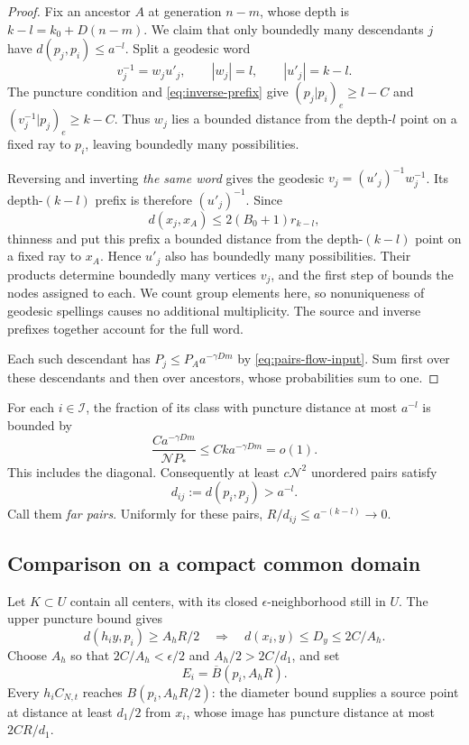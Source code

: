\begin{proof}
Fix an ancestor $A$ at generation $n-m$, whose depth is
$k-l=k_0+D(n-m)$. We claim that only boundedly
many descendants $j$ have $d(p_j,p_i)\le a^{-l}$. Split a geodesic word
\[
 v_j^{-1}=w_ju'_j,\qquad |w_j|=l,\qquad |u'_j|=k-l.
\]
The puncture condition and \eqref{eq:inverse-prefix} give
$(p_j|p_i)_e\ge l-C$ and $(v_j^{-1}|p_j)_e\ge k-C$.
Thus $w_j$ lies a bounded distance from the depth-$l$ point on a fixed
ray to $p_i$, leaving boundedly many possibilities.

Reversing and inverting \emph{the same word} gives the geodesic
$v_j=(u'_j)^{-1}w_j^{-1}$. Its depth-$(k-l)$ prefix is therefore
$(u'_j)^{-1}$. Since
\[
 d(x_j,x_A)\le2(B_0+1)r_{k-l},
\]
thinness and  put this prefix a bounded distance from
the depth-$(k-l)$ point on a fixed ray to $x_A$. Hence $u'_j$ also has
boundedly many possibilities. Their products determine boundedly
many vertices $v_j$, and the first step of
 bounds the nodes assigned to each.
We count group elements here, so nonuniqueness of geodesic spellings
causes no additional multiplicity. The source and inverse prefixes
together account for the full word.

Each such descendant has $P_j\le P_Aa^{-\gamma Dm}$ by
\eqref{eq:pairs-flow-input}. Sum first over these descendants and
then over ancestors, whose probabilities sum to one.
\end{proof}

For each $i\in\mathcal I$, the fraction of its class with puncture
distance at most $a^{-l}$ is bounded by
\[
 \frac{Ca^{-\gamma Dm}}{\mathcal NP_*}
 \le Ck a^{-\gamma Dm}=o(1).
\]
This includes the diagonal. Consequently at least $c\mathcal N^2$
unordered pairs satisfy
\begin{equation}
 d_{ij}:=d(p_i,p_j)>a^{-l}.
 \label{eq:far-pair}
\end{equation}
Call them \emph{far pairs}. Uniformly for these pairs,
$R/d_{ij}\le a^{-(k-l)}\to0$.

\subsection{Comparison on a compact common domain}

Let $K\subset U$ contain all centers, with its closed
$\epsilon$-neighborhood still in $U$. The upper puncture bound gives
\begin{equation}
 d(h_i y,p_i)\ge A_hR/2
 \quad\Longrightarrow\quad
 d(x_i,y)\le D_y\le2C/A_h.
 \label{eq:exterior-preimage}
\end{equation}
Choose $A_h$ so that $2C/A_h<\epsilon/2$ and $A_h/2>2C/d_1$, and set
\[
 E_i=\overline B(p_i,A_hR).
\]
Every $h_iC_{N,t}$ reaches $B(p_i,A_hR/2)$: the diameter bound supplies
a source point at distance at least $d_1/2$ from $x_i$, whose image
has puncture distance at most $2CR/d_1$.

